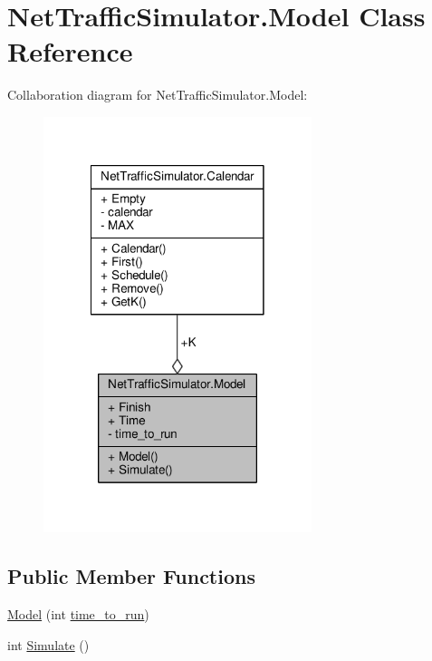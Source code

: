 \hypertarget{classNetTrafficSimulator_1_1Model}{\section{Net\-Traffic\-Simulator.\-Model Class Reference}
\label{classNetTrafficSimulator_1_1Model}
}


Collaboration diagram for Net\-Traffic\-Simulator.\-Model\-:
\nopagebreak
\begin{figure}[H]
\begin{center}
\leavevmode
\includegraphics[width=222pt]{classNetTrafficSimulator_1_1Model__coll__graph}
\end{center}
\end{figure}
\subsection*{Public Member Functions}
\begin{DoxyCompactItemize}
\item 
\hyperlink{classNetTrafficSimulator_1_1Model_ad9698499cd42431307eafdeb5bc3a389}{Model} (int \hyperlink{classNetTrafficSimulator_1_1Model_aebc7f9cbd7b5173c05d8a382677936b5}{time\-\_\-to\-\_\-run})
\item 
int \hyperlink{classNetTrafficSimulator_1_1Model_ad14992e9ea6dbec2bd99a3f5daff218b}{Simulate} ()
\end{DoxyCompactItemize}
